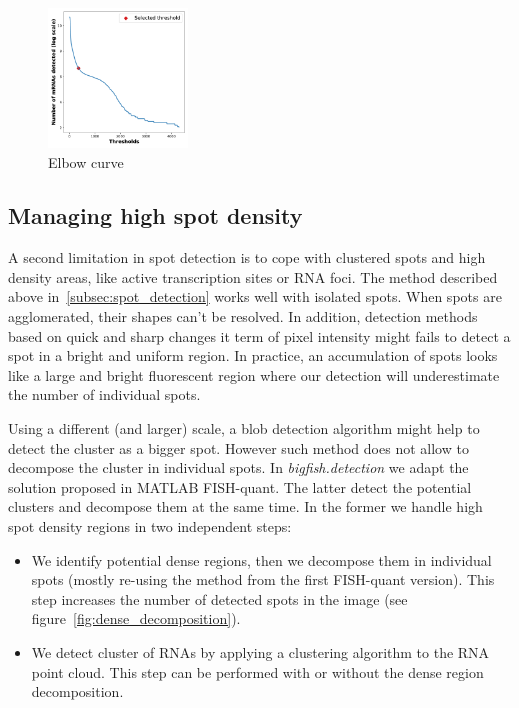 \begin{figure}
	\begin{center}
		\includegraphics[width=0.33\textwidth]{figures/chapter2/elbow_curve_real}
	\caption{Elbow curve}
	\label{fig:elbow_detection}
	\end{center}
\end{figure}

\subsection{Managing high spot density} \label{subsec:dense_decomposition}

A second limitation in spot detection is to cope with clustered spots and high density areas, like active transcription sites or \ac{RNA} foci.
The method described above in~\ref{subsec:spot_detection} works well with isolated spots.
When spots are agglomerated, their shapes can't be resolved.
In addition, detection methods based on quick and sharp changes it term of pixel intensity might fails to detect a spot in a bright and uniform region.
In practice, an accumulation of spots looks like a large and bright fluorescent region where our detection will underestimate the number of individual spots.

Using a different (and larger) scale, a blob detection algorithm\cite{walt_scikit-image_2014} might help to detect the cluster as a bigger spot.
However such method does not allow to decompose the cluster in individual spots.
In \emph{bigfish.detection} we adapt the solution proposed in MATLAB FISH-quant\cite{mueller_fish-quant_2013}.
The latter detect the potential clusters and decompose them at the same time.
In the former we handle high spot density regions in two independent steps:

\begin{itemize}
	\item We identify potential dense regions, then we decompose them in individual spots (mostly re-using the method from the first FISH-quant version).
	This step increases the number of detected spots in the image (see figure~\ref{fig:dense_decomposition}).
	\item We detect cluster of \ac{RNA}s by applying a clustering algorithm to the \ac{RNA} point cloud.
	This step can be performed with or without the dense region decomposition.
\end{itemize}

